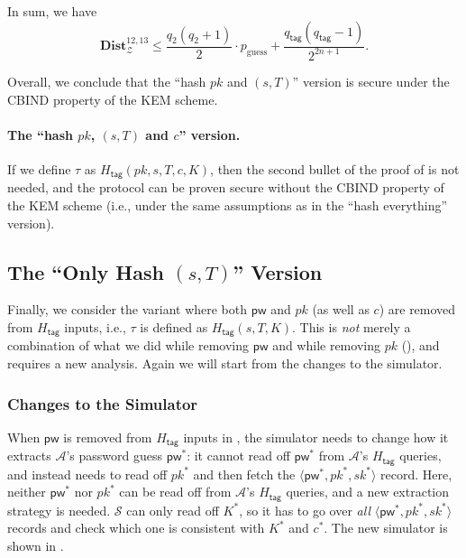 \documentclass{article}
\theoremstyle{plain}
\theoremstyle{definition}
\theoremstyle{remark}
\newcommand{\adv}{\mathcal{A}}
\newcommand{\env}{\mathcal{Z}}
\renewcommand{\sim}{\mathcal{S}}
\newcommand{\Dist}{\mathbf{Dist}}
\newcommand{\Htag}{H_\mathsf{tag}}
\newcommand{\pw}{\mathsf{pw}}
\newcommand{\qtag}{q_\mathsf{tag}}
\begin{document}
In sum, we have
\[
\Dist_\env^{12,13} \leq \frac{q_2(q_2+1)}{2}\cdot p_\text{guess} + \frac{\qtag(\qtag-1)}{2^{2n+1}}.
\]

Overall, we conclude that the ``hash $pk$ and $(s,T)$'' version is secure under the CBIND property of the KEM scheme.

\paragraph{The ``hash $pk$, $(s,T)$ and $c$'' version.}
If we define $\tau$ as $\Htag(pk,s,T,c,K)$, then the second bullet of the proof of  is not needed, and the protocol can be proven secure without the CBIND property of the KEM scheme (i.e., under the same assumptions as in the ``hash everything'' version).

\subsection{The ``Only Hash $(s,T)$'' Version}
\label{sec:hash-st}

Finally, we consider the variant where both $\pw$ and $pk$ (as well as $c$) are removed from $\Htag$ inputs, i.e., $\tau$ is defined as $\Htag(s,T,K)$. This is \emph{not} merely a combination of what we did while removing $\pw$ and while removing $pk$ (), and requires a new analysis. Again we will start from the changes to the simulator.

\subsubsection{Changes to the Simulator}
When $\pw$ is removed from $\Htag$ inputs in , the simulator needs to change how it extracts $\adv$'s password guess $\pw^*$: it cannot read off $\pw^*$ from $\adv$'s $\Htag$ queries, and instead needs to read off $pk^*$ and then fetch the $\langle\pw^*,pk^*,sk^*\rangle$ record. Here, neither $\pw^*$ nor $pk^*$ can be read off from $\adv$'s $\Htag$ queries, and a new extraction strategy is needed. $\sim$ can only read off $K^*$, so it has to go over \emph{all} $\langle\pw^*,pk^*,sk^*\rangle$ records and check which one is consistent with $K^*$ and $c^*$. The new simulator is shown in .
\end{document}
